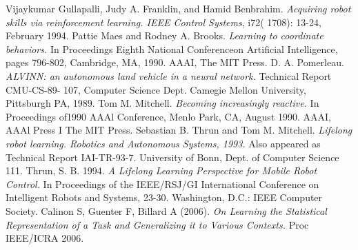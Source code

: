\documentclass[conference]{IEEEtran}
\begin{document}
\begin{thebibliography}{1}

Vijaykumar Gullapalli,  Judy A. Franklin, and Hamid Benbrahim.  \emph{Acquiring robot skills via reinforcement  learning. IEEE Control Systems}, i72(  1708):  13-24, February  1994. 
Pattie Maes and Rodney A. Brooks.  \emph{Learning to coordinate behaviors.} In Proceedings Eighth National Conferenceon Artificial Intelligence,  pages 796-802, Cambridge, MA, 1990.  AAAI, The MIT Press. 
D.  A. Pomerleau.  \emph{ALVINN: an  autonomous land vehicle  in  a neural network.}  Technical Report CMU-CS-89- 107, Computer Science Dept. Camegie Mellon University, Pittsburgh PA, 1989.
Tom M. Mitchell.  \emph{Becoming  increasingly reactive.}  In Proceedings of1990 AAAl Conference, Menlo Park, CA, August  1990.  AAAI, AAAl Press I The MIT Press. 
Sebastian B. Thrun and Tom M. Mitchell.  \emph{Lifelong robot learning. Robotics and Autonomous Systems, 1993.} Also appeared as Technical Report IAI-TR-93-7.  University of Bonn, Dept.  of Computer Science 111.
Thrun, S. B. 1994. \emph{A Lifelong Learning Perspective for Mobile Robot Control.} In Proceedings of the IEEE/RSJ/GI International Conference on Intelligent Robots and Systems, 23-30. Washington, D.C.: IEEE Computer Society.
Calinon S, Guenter F, Billard A (2006). \emph{On Learning the Statistical Representation of a Task and Generalizing it to Various Contexts.}  Proc IEEE/ICRA 2006.

\end{thebibliography}

\end{document}

